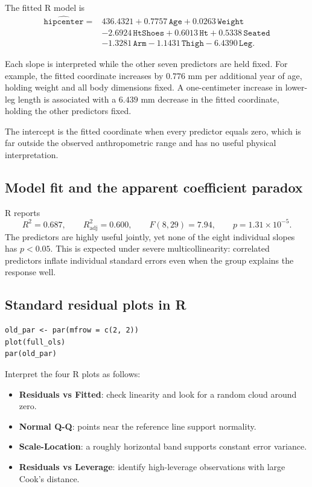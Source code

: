 ﻿\documentclass[11pt]{article}
\begin{document}
The fitted R model is
\begin{align*}
\widehat{\texttt{hipcenter}}
={}&436.4321+0.7757\,\texttt{Age}
+0.0263\,\texttt{Weight}\\
&-2.6924\,\texttt{HtShoes}
+0.6013\,\texttt{Ht}
+0.5338\,\texttt{Seated}\\
&-1.3281\,\texttt{Arm}
-1.1431\,\texttt{Thigh}
-6.4390\,\texttt{Leg}.
\end{align*}

Each slope is interpreted while the other seven predictors are held fixed. For
example, the fitted coordinate increases by $0.776$ mm per additional year of
age, holding weight and all body dimensions fixed. A one-centimeter increase in
lower-leg length is associated with a $6.439$ mm decrease in the fitted
coordinate, holding the other predictors fixed.

The intercept is the fitted coordinate when every predictor equals zero, which
is far outside the observed anthropometric range and has no useful physical
interpretation.

\subsection{Model fit and the apparent coefficient paradox}

R reports
\[
R^2=0.687,\qquad R^2_{\mathrm{adj}}=0.600,
\qquad F(8,29)=7.94,\qquad p=1.31\times10^{-5}.
\]
The predictors are highly useful jointly, yet none of the eight individual
slopes has $p<0.05$. This is expected under severe multicollinearity: correlated
predictors inflate individual standard errors even when the group explains the
response well.

\subsection{Standard residual plots in R}

\begin{lstlisting}
old_par <- par(mfrow = c(2, 2))
plot(full_ols)
par(old_par)
\end{lstlisting}

Interpret the four R plots as follows:

\begin{itemize}
  \item \textbf{Residuals vs Fitted}: check linearity and look for a random cloud
  around zero.
  \item \textbf{Normal Q-Q}: points near the reference line support normality.
  \item \textbf{Scale-Location}: a roughly horizontal band supports constant
  error variance.
  \item \textbf{Residuals vs Leverage}: identify high-leverage observations with
  large Cook's distance.
\end{itemize}
\end{document}
